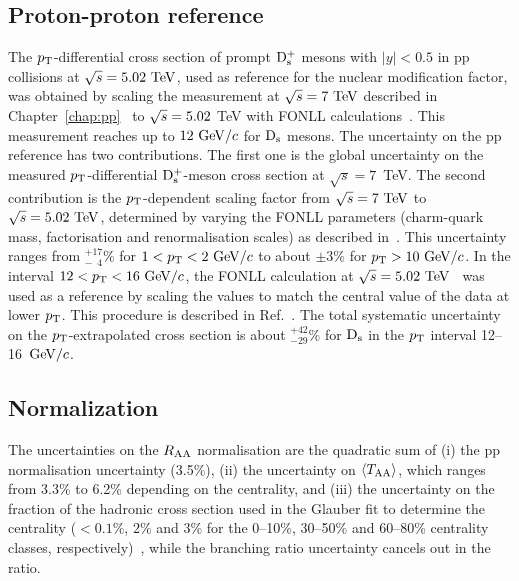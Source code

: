 \subsection{Proton-proton reference}
\label{sec:PPrefSyst}
The $p_{\rm T}$-differential cross section of prompt ${\rm D_s^+}$ mesons with 
$|y|<0.5$ in pp collisions at $\sqrt s=5.02~\mathrm{TeV}$, used as reference 
for the nuclear modification factor, was obtained by scaling the 
measurement at $\sqrt{s}=7~\mathrm{TeV}$ described in 
Chapter~\ref{chap:pp}~\cite{Acharya:2017jgo} to $\sqrt{s} = 5.02$ TeV 
with FONLL calculations~\cite{Cacciari:2012ny}. This measurement 
reaches up to $12~\mathrm{GeV}/c$ for ${\rm D_s}$ mesons.
The uncertainty on the pp reference 
has two contributions. The first one is the global uncertainty on the measured 
$p_{\rm T}$-differential ${\rm D_s^+}$-meson cross section at $\sqrt s=7$~TeV.
The second contribution is the $p_{\rm T}$-dependent scaling factor 
from $\sqrt{s}=7~\mathrm{TeV}$ to $\sqrt{s}=5.02~\mathrm{TeV}$, determined by varying
the FONLL parameters (charm-quark mass, factorisation and renormalisation scales) 
as described in~\cite{Averbeck:2011ga}. This uncertainty ranges from 
$^{+17}_{-\phantom{1}4}\%$ for $1<p_{\rm T}<2~\mathrm{GeV}/c$ to about $\pm3\%$ for $p_{\rm T}>10~\mathrm{GeV}/c$.
In the interval $12<p_{\rm T}<16~\mathrm{GeV}/c$, the FONLL calculation at 
$\sqrt s=5.02~\mathrm{TeV}$~\cite{Cacciari:2012ny} was used as a reference 
by scaling the values to match the central value of the data at lower $p_{\rm T}$. 
This procedure is described in Ref.~\cite{Adam:2015sza}. The total 
systematic uncertainty on the $p_{\rm T}$-extrapolated cross section is about 
$^{+42}_{-29}\%$ for ${\rm D_s}$ in the $p_{\rm T}$ interval 12--16~$\mathrm{GeV}/c$.


\subsection{Normalization}
\label{sec:NormalizSyst}
The uncertainties on the $R_{\rm AA}$ normalisation are the quadratic sum of 
(i) the pp normalisation uncertainty (3.5\%), 
(ii) the uncertainty on $\langle T_{\rm AA} \rangle$, which ranges from 3.3\% to 6.2\% depending on the centrality, and
(iii) the uncertainty on the fraction of the hadronic cross section used in the 
Glauber fit to determine the centrality ($<0.1\%$, $2\%$ and $3\%$ for the 0--10\%, 30--50\% 
and 60--80\% centrality classes, respectively)~\cite{Adam:2015sza}, while the branching ratio uncertainty cancels out in the 
ratio.

